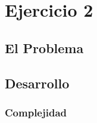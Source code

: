 \section{Ejercicio 2}

\subsection{El Problema}

\subsection{Desarrollo}

\subsubsection{Complejidad}
